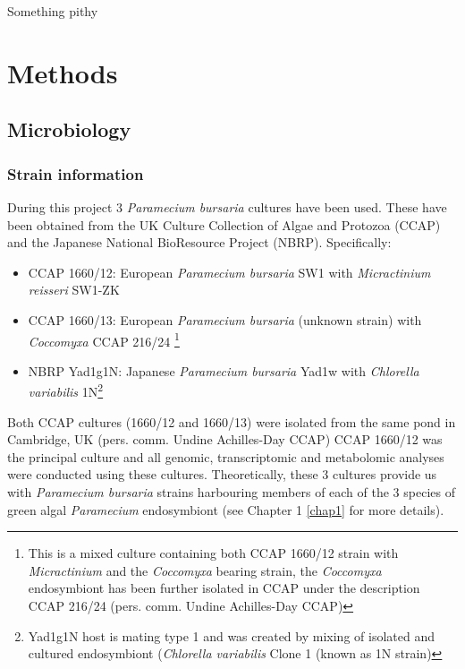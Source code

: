 \graphicspath{{chapters/2.Methods/figures/}}


\begin{savequote}[75mm]
    Something pithy
\end{savequote}

\chapter{Methods}

\section{Microbiology}
\subsection{Strain information}
During this project 3 \textit{Paramecium bursaria} cultures have been used.  These have been obtained from 
the UK Culture Collection of Algae and Protozoa (CCAP) and the Japanese National BioResource Project (NBRP).
Specifically:
\begin{itemize}
    \item CCAP 1660/12: European \textit{Paramecium bursaria} SW1 with \textit{Micractinium reisseri} SW1-ZK \citep{Hoshina2010}
    \item CCAP 1660/13: European \textit{Paramecium bursaria} (unknown strain) with \textit{Coccomyxa} CCAP 216/24 \footnote{This is a mixed culture 
            containing both CCAP 1660/12 strain with \textit{Micractinium} and the \textit{Coccomyxa} bearing strain, 
        the \textit{Coccomyxa} endosymbiont has been further isolated in CCAP under the description CCAP 216/24 (pers. comm. Undine Achilles-Day CCAP)}
    \item NBRP Yad1g1N: Japanese \textit{Paramecium bursaria} Yad1w with \textit{Chlorella variabilis} 1N\footnote{
        Yad1g1N host is mating type 1 and was created by mixing of isolated and 
        cultured endosymbiont (\textit{Chlorella variabilis} Clone 1 (known as 1N strain)
        }
\end{itemize}

Both CCAP cultures (1660/12 and 1660/13) were isolated from the same pond in Cambridge, UK (pers. comm. Undine Achilles-Day CCAP)
CCAP 1660/12 was the principal culture and all genomic, transcriptomic and metabolomic analyses were conducted using these cultures. 
Theoretically, these 3 cultures provide us with \textit{Paramecium bursaria} strains harbouring members of each of the 3 species of 
green algal \textit{Paramecium} endosymbiont (see Chapter 1 \ref{chap1} for more details).

